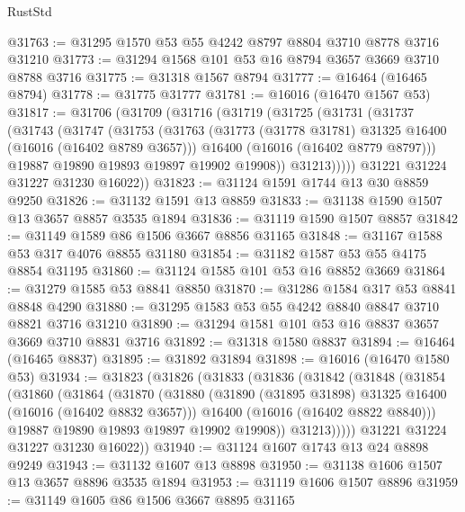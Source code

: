 \begin{lexlean}{RustStd}
\begin{coremodule}
@31763 := @31295 @1570 @53 @55 @4242 @8797 @8804 @3710 @8778 @3716 @31210
@31773 := @31294 @1568 @101 @53 @16 @8794 @3657 @3669 @3710 @8788 @3716
@31775 := @31318 @1567 @8794
@31777 := @16464 (@16465 @8794)
@31778 := @31775 @31777
@31781 := @16016 (@16470 @1567 @53)
@31817 := @31706
    (@31709
      (@31716
        (@31719
          (@31725
            (@31731
              (@31737
                (@31743
                  (@31747
                    (@31753
                      (@31763
                        (@31773 (@31778 @31781) @31325 @16400 (@16016 (@16402 @8789 @3657)))
                        @16400
                        (@16016 (@16402 @8779 @8797)))
                      @19887
                      @19890
                      @19893
                      @19897
                      @19902
                      @19908))
                  @31213)))))
        @31221
        @31224
        @31227
        @31230
        @16022))
@31823 := @31124 @1591 @1744 @13 @30 @8859 @9250
@31826 := @31132 @1591 @13 @8859
@31833 := @31138 @1590 @1507 @13 @3657 @8857 @3535 @1894
@31836 := @31119 @1590 @1507 @8857
@31842 := @31149 @1589 @86 @1506 @3667 @8856 @31165
@31848 := @31167 @1588 @53 @317 @4076 @8855 @31180
@31854 := @31182 @1587 @53 @55 @4175 @8854 @31195
@31860 := @31124 @1585 @101 @53 @16 @8852 @3669
@31864 := @31279 @1585 @53 @8841 @8850
@31870 := @31286 @1584 @317 @53 @8841 @8848 @4290
@31880 := @31295 @1583 @53 @55 @4242 @8840 @8847 @3710 @8821 @3716 @31210
@31890 := @31294 @1581 @101 @53 @16 @8837 @3657 @3669 @3710 @8831 @3716
@31892 := @31318 @1580 @8837
@31894 := @16464 (@16465 @8837)
@31895 := @31892 @31894
@31898 := @16016 (@16470 @1580 @53)
@31934 := @31823
    (@31826
      (@31833
        (@31836
          (@31842
            (@31848
              (@31854
                (@31860
                  (@31864
                    (@31870
                      (@31880
                        (@31890 (@31895 @31898) @31325 @16400 (@16016 (@16402 @8832 @3657)))
                        @16400
                        (@16016 (@16402 @8822 @8840)))
                      @19887
                      @19890
                      @19893
                      @19897
                      @19902
                      @19908))
                  @31213)))))
        @31221
        @31224
        @31227
        @31230
        @16022))
@31940 := @31124 @1607 @1743 @13 @24 @8898 @9249
@31943 := @31132 @1607 @13 @8898
@31950 := @31138 @1606 @1507 @13 @3657 @8896 @3535 @1894
@31953 := @31119 @1606 @1507 @8896
@31959 := @31149 @1605 @86 @1506 @3667 @8895 @31165

\end{coremodule}
\end{lexlean}
